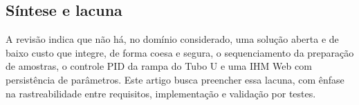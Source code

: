 \subsection{S\'intese e lacuna}

A revis\~ao indica que n\~ao h\'a, no dom\'inio considerado, uma solu\c{c}\~ao
aberta e de baixo custo que integre, de forma coesa e segura, o sequenciamento da
prepara\c{c}\~ao de amostras, o controle PID da rampa do Tubo U e uma IHM Web com
persist\^encia de par\^ametros. Este artigo busca preencher essa lacuna, com
\^enfase na rastreabilidade entre requisitos, implementa\c{c}\~ao e valida\c{c}\~ao
por testes.
